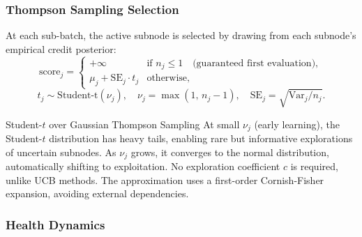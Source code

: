 \documentclass[11pt,a4paper]{article}
\theoremstyle{definition}
\begin{document}
\subsubsection{Thompson Sampling Selection}

At each sub-batch, the active subnode is selected by drawing from each subnode's empirical
credit posterior:
\begin{equation}
  \text{score}_j =
  \begin{cases}
    +\infty & \text{if } n_j \le 1 \quad\text{(guaranteed first evaluation)}, \\
    \mu_j + \mathrm{SE}_j \cdot t_j & \text{otherwise},
  \end{cases}
  \label{eq:thompson}
\end{equation}
\begin{equation}
  t_j \sim \mathrm{Student\text{-}t}(\nu_j),
  \quad \nu_j = \max(1,\, n_j - 1),
  \quad \mathrm{SE}_j = \sqrt{\mathrm{Var}_j / n_j}.
  \label{eq:tstat}
\end{equation}

\begin{designbox}{Student-$t$ over Gaussian Thompson Sampling}
  At small $\nu_j$ (early learning), the Student-$t$ distribution has heavy tails,
  enabling rare but informative explorations of uncertain subnodes.
  As $\nu_j$ grows, it converges to the normal distribution, automatically shifting to
  exploitation. No exploration coefficient $c$ is required, unlike UCB methods.
  The approximation uses a first-order Cornish-Fisher expansion, avoiding external dependencies.
\end{designbox}

\subsubsection{Health Dynamics}
\end{document}
